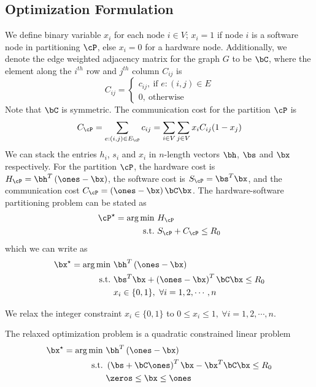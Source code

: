 \subsection{Optimization Formulation}
We define binary variable $x_i$ for each node $i \in V$; $x_i=1$ if node $i$ is a software node in partitioning $\cP$, else $x_i=0$ for a hardware node.
Additionally, we denote the edge weighted adjacency matrix for the graph $G$ to be $\bC$, where the element along the $i^{th}$ row and $j^{th}$ column $C_{ij}$ is \[C_{ij}=\begin{cases}c_{ij},~ \textrm{if } e:(i,j) \in E \\ 0,~ \textrm{otherwise}\end{cases}\] Note that $\bC$ is symmetric.
The communication cost for the partition $\cP$ is 
\[C_{\cP} = \sum_{e:(i,j) \in E_\cP} c_{ij}=\sum_{i\in V}\sum_{j\in V}x_i C_{ij} (1-x_j)\]
We can stack the entries $h_i$, $s_i$ and $x_i$ in $n$-length vectors $\bh$, $\bs$ and $\bx$ respectively. For the partition $\cP$, the hardware cost is $H_{\cP}=\bh^T\left(\ones-\bx\right)$, the software cost is $S_{\cP}=\bs^T\bx$, and the communication cost $C_\cP=\left(\ones-\bx\right)\bC\bx$.
The hardware-software partitioning problem can be stated as
\begin{align*}
    \cP^\star = \arg \min & ~ H_\cP\\
    \textrm{s.t.} & ~ S_\cP + C_\cP \leq R_0
\end{align*}
which we can write as
\begin{subequations}
\begin{align}
    \bx^\star = \arg \min & ~ \bh^T\left(\ones - \bx\right)\\
\textrm{s.t.} & ~ \bs^T\bx + \left(\ones - \bx\right)^T\bC\bx \leq R_0\\
& ~ x_i \in \{0,1\},~\forall i=1,2,\cdots,n
\end{align}
\end{subequations}
\begin{relaxation}
    We relax the integer constraint $x_i \in \{0,1\}$ to $0 \leq x_i \leq 1,~ \forall i=1,2,\cdots,n$. 
\end{relaxation}
The relaxed optimization problem is a quadratic constrained linear problem
\begin{subequations}
\begin{align}
    \bx^\star = \arg \min & ~ \bh^T\left(\ones - \bx\right)\\
\textrm{s.t.} & ~ \left(\bs+\bC\ones\right)^T\bx - \bx^T\bC\bx \leq R_0\\
& ~ \zeros \leq \bx \leq \ones
\end{align}
\end{subequations}
